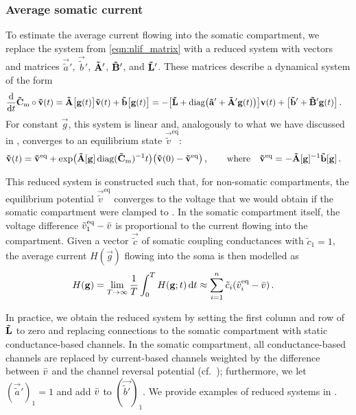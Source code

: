 \subsubsection{Average somatic current}
To estimate the average current flowing into the somatic compartment, we replace the system from \cref{eqn:nlif_matrix} with a reduced system with vectors and matrices $\vec{\tilde a}'$, $\vec{\tilde b}'$, $\mathbf{\tilde A}'$, $\mathbf{\tilde B}'$, and $\mathbf{\tilde L}'$.
These matrices describe a dynamical system of the form%
\begin{align}
	\frac{\mathrm{d}}{\mathrm{d} t} \mathbf{\tilde C}_\mathrm{m} \circ \mathbf{\tilde v}(t)
	&= \mathbf{\tilde A}\big[\mathbf{g}(t)\big] \mathbf{\tilde v}(t) + \mathbf{\tilde b}\big[\mathbf{g}(t)\big]
	 = -\big[\mathbf{\tilde L} + \mathrm{diag}\big(\mathbf{\tilde a'} + \mathbf{\tilde A'} \mathbf{g}(t)\big)\big] \mathbf{v}(t) + \big[\mathbf{\tilde b}' + \mathbf{\tilde B}' \mathbf{g}(t)\big] \,.
	\label{eqn:nlif_matrix_reduced}
\end{align}
For constant $\vec g$, this system is linear and, analogously to what we have discussed in , converges to an equilibrium state $\vec {\tilde v}^\mathrm{eq}$:
\begin{align}
	\mathbf{\tilde v}(t)
	=
	  \mathbf{\tilde v}^\mathrm{eq}
	+ \exp\bigl(
		\mathbf{\tilde A}[\mathbf{g}] \operatorname{\mathrm{diag}}(\mathbf{\tilde C}_\mathrm{m})^{-1} t
	  \bigr) \bigl(
	    \mathbf{\tilde v}(0) - \mathbf{\tilde v}^\mathrm{eq}
	  \bigr) \,,
	\quad\quad \text{where} \quad \mathbf{\tilde v}^\mathrm{eq} &= -{\mathbf{\tilde A}}[\mathbf{g}]^{-1} \mathbf{\tilde b}[\mathbf{g}] \,.
	\label{eqn:nlif_eq}
\end{align}

This reduced system is constructed such that, for non-somatic compartments, the equilibrium potential $\vec{\tilde v}^\mathrm{eq}$ converges to the voltage that we would obtain if the somatic compartment were clamped to \vSom.
In the somatic compartment itself, the voltage difference $\tilde v^\mathrm{eq}_1 - {{\bar v}}$ is proportional to the current flowing into the compartment.
Given a vector $\vec{\tilde c}$ of somatic coupling conductances with $\tilde c_1 = 1$, the average current $H(\vec g)$ flowing into the soma is then modelled as
\begin{align}
	H(\mathbf{g}) &= \lim_{T \to \infty} \frac{1}T \int_{0}^T H(\mathbf{g}; t) \,\mathrm{d} t \approx \sum_{i = 1}^n \tilde c_i (\tilde v^\mathrm{eq}_i - {{\bar v}}) \,.
	\label{eqn:h_model}
\end{align}

In practice, we obtain the reduced system by setting the first column and row of $\mathbf{\tilde L}$ to zero and replacing connections to the somatic compartment with static conductance-based channels.
In the somatic compartment, all conductance-based channels are replaced by current-based channels weighted by the difference between ${{\bar v}}$ and the channel reversal potential (cf.~\cite{stockel2017point}); furthermore, we let $(\vec {\tilde a}')_1 = 1$ and add ${{\bar v}}$ to $(\vec {\tilde b'})_1$.
We provide examples of reduced systems in .


